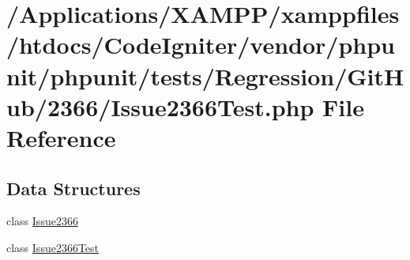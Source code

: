 \hypertarget{_issue2366_test_8php}{}\section{/\+Applications/\+X\+A\+M\+P\+P/xamppfiles/htdocs/\+Code\+Igniter/vendor/phpunit/phpunit/tests/\+Regression/\+Git\+Hub/2366/\+Issue2366\+Test.php File Reference}
\label{_issue2366_test_8php}
\subsection*{Data Structures}
\begin{DoxyCompactItemize}
\item 
class \mbox{\hyperlink{class_issue2366}{Issue2366}}
\item 
class \mbox{\hyperlink{class_issue2366_test}{Issue2366\+Test}}
\end{DoxyCompactItemize}
